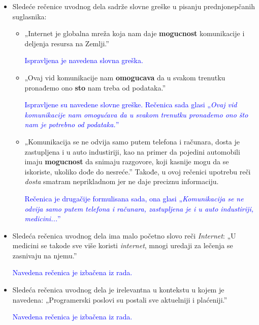 \documentclass[a4paper]{report}
\newcommand{\odgovor}[1]{\textcolor{blue}{#1}}
\begin{document}
\begin{itemize}
    \item Sledeće rečenice uvodnog dela sadrže slovne greške u pisanju prednjonepčanih suglasnika:
    \begin{itemize}
    \item„Internet je globalna mreža koja nam daje \textbf{mogucnost} komunikacije i deljenja resursa na Zemlji.”
    
    \odgovor{Ispravljena je navedena slovna greška.}
    \end{itemize}
    \begin{itemize}
    \item „Ovaj vid komunikacije nam \textbf{omogucava} da u svakom trenutku pronađemo ono  \textbf{sto} nam treba od podataka.”
   
    \odgovor{Ispravljene su navedene slovne greške. Rečenica sada glasi „\textit{Ovaj vid komunikacije nam omogućava da u svakom trenutku pronademo ono što nam je potrebno od podataka.}”}
    \end{itemize}
     \begin{itemize}
    \item „Komunikacija se ne odvija samo putem telefona i računara, dosta je zastupljena i u auto industiriji, kao na primer da pojedini automobili imaju \textbf{mogucnost} da snimaju razgovore, koji kasnije mogu da se iskoriste, ukoliko dođe do nesreće.”\newline
    Takođe, u ovoj rečenici upotrebu reči \textit{dosta} smatram neprikladnom jer ne daje preciznu informaciju. 
    
    \odgovor{Rečenica je drugačije formulisana sada, ona glasi „\textit{Komunikacija se ne odvija samo putem telefona i računara, zastupljena je i u auto industiriji, medicini...}”}
    
    
    \end{itemize}
\end{itemize}
\begin{itemize}
    \item Sledeća rečenica uvodnog dela ima malo početno slovo reči \textit{Internet}:\newline
       „U medicini se takode sve više koristi \textit{internet}, mnogi uredaji za lečenja se zasnivaju na njemu.”

    \odgovor{Navedena rečenica je izbačena iz rada.}
       
\end{itemize}
\begin{itemize}
    \item Sledeća rečenica uvodnog dela je irelevantna u kontekstu u kojem je navedena:\newline
    „Programerski poslovi su postali sve aktuelniji i plaćeniji.”
    
    \odgovor{Navedena rečenica je izbačena iz rada.}
    
\end{itemize}
\end{document}
